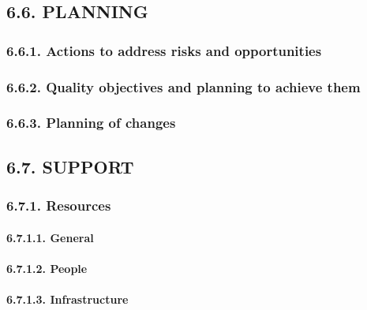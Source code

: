 \documentclass[
]{article}
\begin{document}
\hypertarget{planning-1}{%
\subsection{6.6. PLANNING}\label{planning-1}}

\hypertarget{actions-to-address-risks-and-opportunities-1}{%
\subsubsection{6.6.1. Actions to address risks and
opportunities}\label{actions-to-address-risks-and-opportunities-1}}

\hypertarget{quality-objectives-and-planning-to-achieve-them-1}{%
\subsubsection{6.6.2. Quality objectives and planning to achieve
them}\label{quality-objectives-and-planning-to-achieve-them-1}}

\hypertarget{planning-of-changes-1}{%
\subsubsection{6.6.3. Planning of changes}\label{planning-of-changes-1}}

\hypertarget{support-1}{%
\subsection{6.7. SUPPORT}\label{support-1}}

\hypertarget{resources-1}{%
\subsubsection{6.7.1. Resources}\label{resources-1}}

\hypertarget{general-10}{%
\paragraph{6.7.1.1. General}\label{general-10}}

\hypertarget{people-1}{%
\paragraph{6.7.1.2. People}\label{people-1}}

\hypertarget{infrastructure-1}{%
\paragraph{6.7.1.3. Infrastructure}\label{infrastructure-1}}
\end{document}
